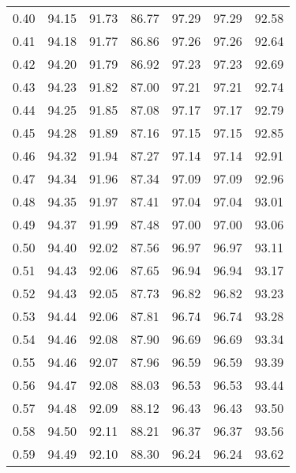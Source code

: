 \begin{tabular}{|c|c|c|c|c|c|c|}
      0.40 &     94.15 &     91.73 &      86.77 &   97.29 &      97.29 &         92.58 \\
      0.41 &     94.18 &     91.77 &      86.86 &   97.26 &      97.26 &         92.64 \\
      0.42 &     94.20 &     91.79 &      86.92 &   97.23 &      97.23 &         92.69 \\
      0.43 &     94.23 &     91.82 &      87.00 &   97.21 &      97.21 &         92.74 \\
      0.44 &     94.25 &     91.85 &      87.08 &   97.17 &      97.17 &         92.79 \\
      0.45 &     94.28 &     91.89 &      87.16 &   97.15 &      97.15 &         92.85 \\
      0.46 &     94.32 &     91.94 &      87.27 &   97.14 &      97.14 &         92.91 \\
      0.47 &     94.34 &     91.96 &      87.34 &   97.09 &      97.09 &         92.96 \\
      0.48 &     94.35 &     91.97 &      87.41 &   97.04 &      97.04 &         93.01 \\
      0.49 &     94.37 &     91.99 &      87.48 &   97.00 &      97.00 &         93.06 \\
      0.50 &     94.40 &     92.02 &      87.56 &   96.97 &      96.97 &         93.11 \\
      0.51 &     94.43 &     92.06 &      87.65 &   96.94 &      96.94 &         93.17 \\
      0.52 &     94.43 &     92.05 &      87.73 &   96.82 &      96.82 &         93.23 \\
      0.53 &     94.44 &     92.06 &      87.81 &   96.74 &      96.74 &         93.28 \\
      0.54 &     94.46 &     92.08 &      87.90 &   96.69 &      96.69 &         93.34 \\
      0.55 &     94.46 &     92.07 &      87.96 &   96.59 &      96.59 &         93.39 \\
      0.56 &     94.47 &     92.08 &      88.03 &   96.53 &      96.53 &         93.44 \\
      0.57 &     94.48 &     92.09 &      88.12 &   96.43 &      96.43 &         93.50 \\
      0.58 &     94.50 &     92.11 &      88.21 &   96.37 &      96.37 &         93.56 \\
      0.59 &     94.49 &     92.10 &      88.30 &   96.24 &      96.24 &         93.62 \\

\end{tabular}
